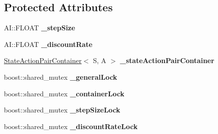 \subsection*{Protected Attributes}
\begin{DoxyCompactItemize}
\item 
\hypertarget{classAI_1_1Algorithm_1_1ReinforcementLearning_ae8a4204e547054e55542e6f7de4b5dc1}{A\-I\-::\-F\-L\-O\-A\-T {\bfseries \-\_\-step\-Size}}\label{classAI_1_1Algorithm_1_1ReinforcementLearning_ae8a4204e547054e55542e6f7de4b5dc1}

\item 
\hypertarget{classAI_1_1Algorithm_1_1ReinforcementLearning_af72ecd83332f502a73f9c5636f433de2}{A\-I\-::\-F\-L\-O\-A\-T {\bfseries \-\_\-discount\-Rate}}\label{classAI_1_1Algorithm_1_1ReinforcementLearning_af72ecd83332f502a73f9c5636f433de2}

\item 
\hypertarget{classAI_1_1Algorithm_1_1ReinforcementLearning_aee3318af6590363309fdd04fb9eeebe5}{\hyperlink{classAI_1_1StateActionPairContainer}{State\-Action\-Pair\-Container}$<$ S, A $>$ {\bfseries \-\_\-state\-Action\-Pair\-Container}}\label{classAI_1_1Algorithm_1_1ReinforcementLearning_aee3318af6590363309fdd04fb9eeebe5}

\item 
\hypertarget{classAI_1_1Algorithm_1_1ReinforcementLearning_aa6cddd34af5d8565ea71796434dc17af}{boost\-::shared\-\_\-mutex {\bfseries \-\_\-general\-Lock}}\label{classAI_1_1Algorithm_1_1ReinforcementLearning_aa6cddd34af5d8565ea71796434dc17af}

\item 
\hypertarget{classAI_1_1Algorithm_1_1ReinforcementLearning_a365513e575cf60c0ae6fd5dfcfc54913}{boost\-::shared\-\_\-mutex {\bfseries \-\_\-container\-Lock}}\label{classAI_1_1Algorithm_1_1ReinforcementLearning_a365513e575cf60c0ae6fd5dfcfc54913}

\item 
\hypertarget{classAI_1_1Algorithm_1_1ReinforcementLearning_acc5503fcb31fb030be0c9d302517adcc}{boost\-::shared\-\_\-mutex {\bfseries \-\_\-step\-Size\-Lock}}\label{classAI_1_1Algorithm_1_1ReinforcementLearning_acc5503fcb31fb030be0c9d302517adcc}

\item 
\hypertarget{classAI_1_1Algorithm_1_1ReinforcementLearning_aaa369f14f7f9b9ddb0bf8efb2b8363dd}{boost\-::shared\-\_\-mutex {\bfseries \-\_\-discount\-Rate\-Lock}}\label{classAI_1_1Algorithm_1_1ReinforcementLearning_aaa369f14f7f9b9ddb0bf8efb2b8363dd}

\end{DoxyCompactItemize}
